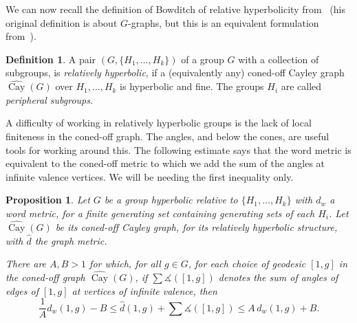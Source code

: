 \documentclass[11pt]{article}
\newtheorem{prop}[theo]{Proposition}
\theoremstyle{definition}
\newtheorem{defi}[theo]{Definition}
\numberwithin{equation}{section}
\DeclareMathOperator{\Cay}{Cay}
\newcommand{\A}{\measuredangle}
\begin{document}
We can now recall the definition of Bowditch of relative hyperbolicity from~\cite{BowRH} (his original definition is about $G$-graphs, but this is an equivalent formulation from~\cite[Appendix]{Dthesis}).

\begin{defi}
A pair $(G,\{H_1, \dots, H_k\})$ of a group $G$ with a collection of subgroups, is \emph{relatively hyperbolic}, if a (equivalently any) coned-off Cayley graph $\widehat{{\Cay}} (G)$ over $H_1, \dots,H_k$ is hyperbolic and fine. The groups $H_i$ are called \emph{peripheral subgroups}.
\end{defi}

A difficulty of working in relatively hyperbolic groups is the lack of local finiteness in the coned-off graph. The angles, and below the cones, are useful tools for working around this. The following estimate says that the word metric is equivalent to the coned-off metric to which we add the sum of the angles at infinite valence vertices. We will be needing the first inequality only.

\begin{prop}\label{prop;pseudo_word_metric}
Let $G$ be a group hyperbolic relative to $\{H_1, \dots, H_k\}$ with $d_w$ a word metric, for a finite generating set containing generating sets of each $H_i$. Let $\widehat{{\Cay}} (G)$ be its coned-off Cayley graph, for its relatively hyperbolic structure, with $\hat{d}$ the graph metric.

There are $A,B>1$ for which, for all $g\in G$, for each choice of geodesic $[1,g]$ in the coned-off graph $\widehat{{\Cay}} (G)$, if $\sum\A ([1,g])$ denotes the sum of angles of edges of $[1,g]$ at vertices of infinite valence, then
\[
\frac1A d_w(1,g) -B \leq \hat{d}(1,g) + \sum\A ([1,g]) \leq A\,d_w(1,g) +B.
\]
\end{prop}
\end{document}
